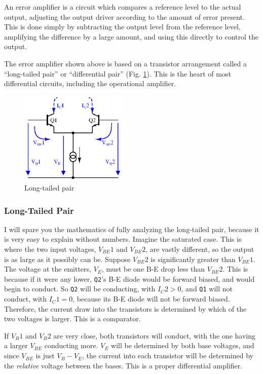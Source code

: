 \begin{multicols}{2}

An error amplifier is a circuit which compares a reference level to the
actual output, adjusting the output driver according to the amount of error
present. This is done simply by subtracting the output level from the
reference level, amplifying the difference by a large amount, and using
this directly to control the output.

The error amplifier shown above is based on a transistor arrangement
called a ``long-tailed
pair'' or ``differential pair'' (Fig. \ref{fig:ltp}). This is the heart of
most differential circuits, including the operational amplifier.


\begin{figure}[H]
\centering
\includegraphics[width=2in]{sch/ltp}
\caption{Long-tailed pair}
\label{fig:ltp}
\end{figure}

\subsubsection{Long-Tailed Pair}
I will spare you the mathematics of fully analyzing the long-tailed pair,
because it is very easy to explain without numbers. Imagine the saturated
case. This is where the two input voltages, $V_{BE}1$ and $V_{BE}2$, are
vastly different, so the output is as large as it possibly can be. Suppose
$V_{BE}2$ is significantly greater than $V_{BE}1$. The voltage at the
emitters, $V_E$, must be one B-E drop less than $V_{BE}2$. This is because if
it were any lower, \texttt{Q2}'s B-E diode would be forward biased, and would
begin to conduct. So \texttt{Q2} will be conducting, with $I_C2 > 0$, and
\texttt{Q1} will not conduct, with $I_C1 = 0$, because its B-E diode will not
be forward biased. Therefore, the current draw into the transistors is
determined by which of the two voltages is larger. This is a comparator.

If $V_B1$ and $V_B2$ are very close, both transistors will conduct, with
the one having a larger $V_{BE}$ conducting more. $V_E$ will be determined
by both base voltages, and since $V_{BE}$ is just $V_B - V_E$, the current
into each transistor will be determined by the \emph{relative} voltage
between the bases. This is a proper differential amplifier.


\end{multicols}
